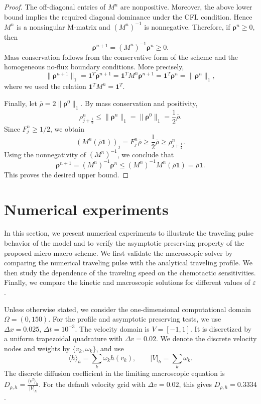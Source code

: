 \documentclass[11pt,twoside]{article}
\numberwithin{equation}{section}
\theoremstyle{plain}
\theoremstyle{nonumberplain}
\newtheorem{proof}{Proof.-}
\newcommand{\brho}{\boldsymbol{\rho}}
\begin{document}
{{\begin{proof}
{The off-diagonal entries of $M^n$ are nonpositive. Moreover, the above
lower bound implies the required diagonal dominance under the CFL
condition. Hence $M^n$ is a nonsingular M-matrix and $(M^n)^{-1}$ is
nonnegative. Therefore, if $\brho^n\ge0$, then
\[
\brho^{n+1}=(M^n)^{-1}\brho^n\ge0.
\]
Mass conservation follows from the conservative form of the scheme and the
homogeneous no-flux boundary conditions.  More precisely, 
\[
\|\brho^{n+1}\|_1
=
\mathbf 1^T\brho^{n+1}
=
\mathbf 1^T M^n\brho^{n+1}
=
\mathbf 1^T\brho^n
=
\|\brho^n\|_1 ,
\]
where we used the relation
\(
\mathbf 1^T M^n=\mathbf 1^T .
\)

Finally, let $\bar\rho=2\|\brho^0\|_1$. By mass conservation and
positivity,
\[
\rho_{j+\frac12}^n\le \|\brho^n\|_1=\|\brho^0\|_1=\frac12\bar\rho .
\]
Since $F_j^n\ge1/2$, we obtain
\[
(M^n(\bar\rho\mathbf 1))_j
=
F_j^n\bar\rho
\ge
\frac12\bar\rho
\ge
\rho_{j+\frac12}^n .
\]
Using the nonnegativity of $(M^n)^{-1}$, we conclude that
\[
\brho^{n+1}
=
(M^n)^{-1}\brho^n
\le
(M^n)^{-1}M^n(\bar\rho\mathbf 1)
=
\bar\rho\mathbf 1 .
\]
This proves the desired upper bound. }
\end{proof}



\section{Numerical experiments}\label{sec: numerics}

In this section, we present numerical experiments to illustrate the
traveling pulse behavior of the model and to verify the asymptotic
preserving property of the proposed micro-macro scheme. We first validate
the macroscopic solver by comparing the numerical traveling pulse with
the analytical traveling profile. We then study the dependence of the
traveling speed on the chemotactic sensitivities. Finally, we compare
the kinetic and macroscopic solutions for different values of
\(\varepsilon\).


Unless otherwise stated, we consider the one-dimensional computational
domain \(\Omega=(0,150)\). For the profile and asymptotic preserving
tests, we use
\(
\Delta x=0.025
\), 
\(
\Delta t=10^{-3}.
\)
The velocity domain is \(V=[-1,1]\). It is discretized by a uniform
trapezoidal quadrature with \(\Delta v=0.02\). We denote the discrete
velocity nodes and weights by \(\{v_k,\omega_k\}\), and use
\[
\langle h\rangle_h=\sum_k\omega_k h(v_k),
\qquad
|V|_h=\sum_k\omega_k .
\]
The discrete diffusion coefficient in the limiting macroscopic equation
is
 $D_{\rho,h}
=
\frac{\langle v^2\rangle_h}{|V|_h}.$
For the default velocity grid with \(\Delta v=0.02\), this gives
\(D_{\rho,h}=0.3334\).


}}
\end{document}
